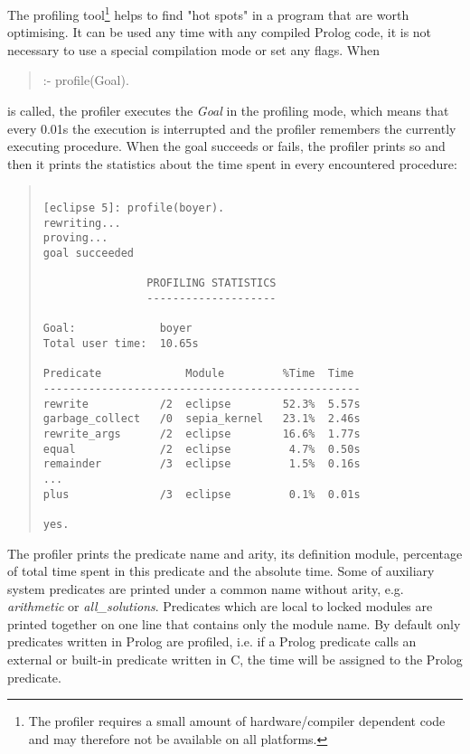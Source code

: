 The profiling tool\footnote{The profiler requires a small amount of
hardware/compiler dependent code and may therefore not be available on
all platforms.}
helps to find "hot spots" in a program that are worth optimising.
It can be used any time with any compiled Prolog code,
it is not necessary to use a special compilation mode or set
any flags.
When
\begin{quote}
:- profile(Goal).
\end{quote}
is called, the profiler executes the {\it Goal} in the profiling mode,
which means that every 0.01s the execution is interrupted
and the profiler remembers the currently executing procedure.
When the goal succeeds or fails, the profiler prints so
and then it prints the statistics about the time spent
in every encountered procedure:

\begin{quote}
\begin{verbatim}

[eclipse 5]: profile(boyer).
rewriting...
proving...
goal succeeded

                PROFILING STATISTICS
                --------------------

Goal:             boyer
Total user time:  10.65s

Predicate             Module         %Time  Time
-------------------------------------------------
rewrite           /2  eclipse        52.3%  5.57s
garbage_collect   /0  sepia_kernel   23.1%  2.46s
rewrite_args      /2  eclipse        16.6%  1.77s
equal             /2  eclipse         4.7%  0.50s
remainder         /3  eclipse         1.5%  0.16s
...
plus              /3  eclipse         0.1%  0.01s

yes.
\end{verbatim}
\end{quote}

The profiler prints the predicate name and arity, its definition module,
percentage of total time spent in this predicate and the absolute time.
Some of auxiliary system predicates are printed under a
common name without arity, e.g. {\it arithmetic} or {\it all_solutions}.
Predicates which are local to locked modules are printed
together on one line that contains only the module name.
By default only predicates written in Prolog are profiled, i.e.
if a Prolog predicate calls an external or built-in predicate
written in C, the time will be assigned to the Prolog predicate.

